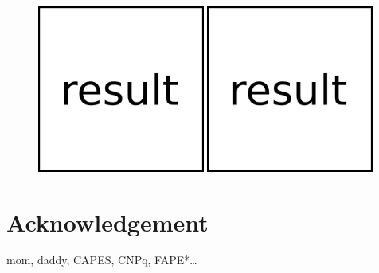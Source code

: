 \documentclass[a1]{sciposter}
\begin{document}
\begin{multicols}{3}
\begin{figure}
	\includegraphics[width=0.49\textwidth]{fig/result.png}
	\includegraphics[width=0.49\textwidth]{fig/result.png}
\end{figure}


\section{Acknowledgement}
mom, daddy, CAPES, CNPq, FAPE*\ldots


\end{multicols}
\end{document}
